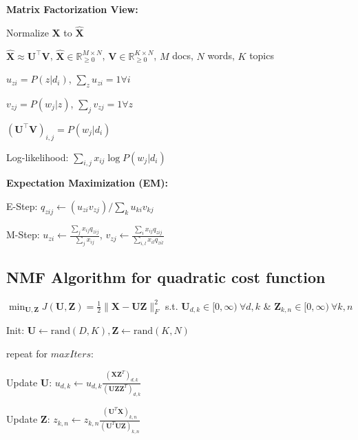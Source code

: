 \documentclass[a4paper, 11pt, landscape]{article}
\begin{document}
\begin{multicols*}{3}
\textbf{Matrix Factorization View:}
\begin{inparaitem}[\color{red}\textbullet]
	\item Normalize $\mathbf{X}$ to $\hat{\mathbf{X}}$
	\item $\hat{\mathbf{X}} \approx \mathbf{U}^\top \mathbf{V}$, $\hat{\mathbf{X}} \in \mathbb{R}^{M \times N}_{\geq 0}$, $\mathbf{V} \in \mathbb{R}^{K\times N}_{\geq 0}$, $M$ docs, $N$ words, $K$ topics
	\item $u_{zi} = P(z|d_i)$, $\sum_{z}u_{zi} = 1 \forall i$
	\item $v_{zj} = P(w_j|z)$, $\sum_{j} v_{zj} = 1 \forall z$
	\item $(\mathbf{U}^\top \mathbf{V})_{i,j} = P(w_j|d_i)$
	\item Log-likelihood: $\sum_{i,j}x_{ij}\log P(w_j|d_i)$
\end{inparaitem}

\textbf{Expectation Maximization (EM):}
\begin{compactenum}
	\item E-Step: $q_{zij} \gets (u_{zi}v_{zj}) / \sum_{k}u_{ki}v_{kj}$
	\item M-Step: $u_{zi} \gets \frac{\sum_j x_{ij}q_{zij}}{\sum_jx_{ij}}$, $v_{zj} \gets \frac{\sum_i x_{ij}q_{zij}}{\sum_{i,l}x_{il}q_{zil}}$
\end{compactenum}

\subsection{NMF Algorithm for quadratic cost function}
$\min_{\mathbf{U}, \mathbf{Z}} J(\mathbf{U}, \mathbf{Z}) = \frac{1}{2} \|\mathbf{X} - \mathbf{U}\mathbf{Z}\|_F^2$ s.t. $\mathbf{U}_{d,k} \in [0, \infty)\ \forall d, k$ \&  $\mathbf{Z}_{k, n} \in [0, \infty)\ \forall k, n$
\begin{inparaenum}
	\item Init: $\mathbf{U} \gets \mathrm{rand}(D,K), \mathbf{Z} \gets \mathrm{rand}(K,N)$
	\item repeat for $\mathit{maxIters}$:
	\item Update $\mathbf{U}$: $u_{d,k} \gets u_{d,k} \frac{(\mathbf{X}\mathbf{Z}^T)_{d,k}}{(\mathbf{U}\mathbf{Z}\mathbf{Z}^T)_{d,k}}$
	\item Update $\mathbf{Z}$: $z_{k,n} \gets z_{k,n} \frac{(\mathbf{U}^T\mathbf{X})_{k,n}}{(\mathbf{U}^T\mathbf{U}\mathbf{Z})_{k,n}}$
\end{inparaenum}

\raggedcolumns
\end{multicols*}
\end{document}
